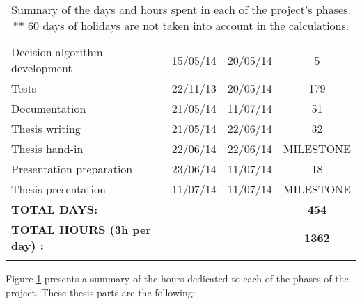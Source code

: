 \begin{table}[H]
\begin{tabular} {l c c c }
\hspace*{0.5cm}	Decision algorithm development	&	15/05/14	&	20/05/14	&	5	\\
\hspace*{0.5cm}	Tests	&	22/11/13	&	20/05/14	&	179\\	
Documentation	&	21/05/14	&	11/07/14	&	51	\\
\hspace*{0.5cm}		Thesis writing	&	21/05/14	&	22/06/14	&	32	\\
\hspace*{0.5cm}		Thesis hand-in	&	22/06/14	&	22/06/14	&	MILESTONE	\\
\hspace*{0.5cm}		Presentation preparation		&	23/06/14	&	11/07/14	&	18	\\
\hspace*{0.5cm}		Thesis presentation		&	11/07/14	&	11/07/14	&	MILESTONE	\\

\addlinespace[3mm]
\bottomrule
\addlinespace[3mm]

\textbf{TOTAL DAYS: 	}		&&&\textbf{	454}	\\
\textbf{TOTAL HOURS (3h per day) :} &&&			\textbf{1362}	\\
\addlinespace[3mm]

\bottomrule
\end{tabular}
\caption[Days and hours per project phase]{Summary of the days and hours spent in each of the project's phases.\\
** 60 days of holidays are not taken into account in the calculations.}	
\label{phases}

\end{table}
\vspace*{0.5cm}


	Figure \ref{phases} presents a summary of the hours dedicated to each of the phases of the project. 
	These thesis parts are the following: 


